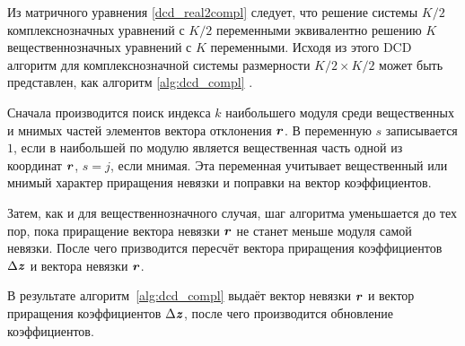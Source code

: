 Из матричного уравнения \eqref{dcd_real2compl} следует, что решение системы $K/2$ комплекснозначных уравнений с $K/2$ переменными эквивалентно решению $K$ вещественнозначных уравнений с $K$ переменными. Исходя из этого DCD алгоритм для комплекснозначной системы размерности $K/2\times K/2$ может быть представлен, как алгоритм \ref{alg:dcd_compl} \cite{dcd_alg_thesis}.
\begin{algorithm}[!ht]
	\caption{Complex-valued leading DCD algorithm}
	\label{alg:dcd_compl}
\end{algorithm}

Сначала производится поиск индекса $k$ наибольшего модуля среди вещественных и мнимых частей элементов вектора отклонения $\textbf{\textit{r}}$. В переменную $s$ записывается $1$, если в наибольшей по модулю является вещественная часть одной из координат $\textbf{\textit{r}}$, $s=j$, если мнимая. Эта переменная учитывает вещественный или мнимый характер приращения невязки и поправки на вектор коэффициентов.

Затем, как и для вещественнозначного случая, шаг алгоритма уменьшается до тех пор, пока приращение вектора невязки $\textbf{\textit{r}}$ не станет меньше модуля самой невязки. После чего призводится пересчёт вектора приращения коэффициентов $\Delta\textbf{\textit{z}}$ и вектора невязки $\textbf{\textit{r}}$.

В результате алгоритм~\ref{alg:dcd_compl} выдаёт вектор невязки $\textbf{\textit{r}}$ и вектор приращения коэффициентов $\Delta\textbf{\textit{z}}$, после чего производится обновление коэффициентов.

